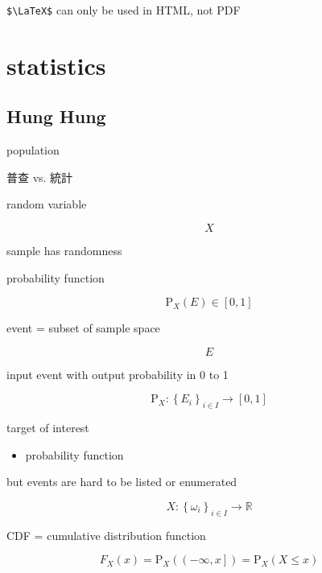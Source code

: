 \documentclass[
]{book}
\providecommand{\tightlist}{%
  \setlength{\itemsep}{0pt}\setlength{\parskip}{0pt}}
\theoremstyle{definition}
\theoremstyle{definition}
\theoremstyle{definition}
\theoremstyle{definition}
\theoremstyle{remark}
\begin{document}
\texttt{\$\textbackslash{}LaTeX\$} can only be used in HTML, not PDF


\chapter{statistics}\label{statistics}

\section{Hung Hung}\label{hung-hung}

population

\begin{CJK}{UTF8}{bsmi}
普查 vs. 統計
\end{CJK}

random variable

\[
X
\]

sample has randomness

probability function

\[
\mathrm{P}_{{\scriptscriptstyle X}}\left(E\right)\in\left[0,1\right]
\]

event = subset of sample space

\[
E
\]

input event with output probability in 0 to 1

\[
\mathrm{P}_{{\scriptscriptstyle X}}:\left\{ E_{{\scriptscriptstyle i}}\right\} _{{\scriptscriptstyle i\in I}}\rightarrow\left[0,1\right]
\]

target of interest

\begin{itemize}
\tightlist
\item
  probability function
\end{itemize}

but events are hard to be listed or enumerated

\[
X:\left\{ \omega_{{\scriptscriptstyle i}}\right\} _{{\scriptscriptstyle i}\in I}\rightarrow\mathbb{R}
\]

CDF = cumulative distribution function

\[
F_{{\scriptscriptstyle X}}\left(x\right)=\mathrm{P}_{{\scriptscriptstyle X}}\left(\left(-\infty,x\right]\right)=\mathrm{P}_{{\scriptscriptstyle X}}\left(X\le x\right)
\]
\end{document}
